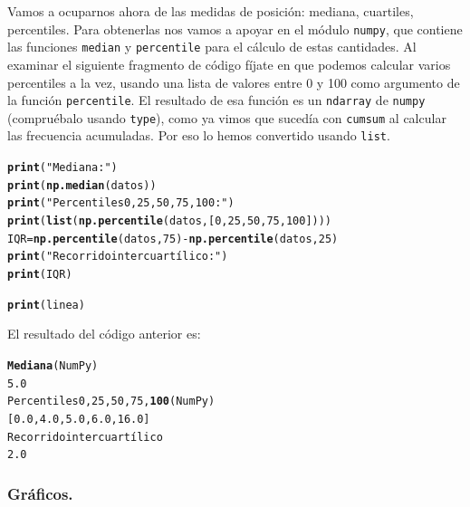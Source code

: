 \documentclass[10pt,a4paper]{article}\usepackage[]{graphicx}\usepackage[]{color}
\makeatletter
\newcommand{\hlstr}[1]{\textcolor[rgb]{0.192,0.494,0.8}{#1}}%
\newcommand{\hlkwd}[1]{\textcolor[rgb]{0.737,0.353,0.396}{\textbf{#1}}}%
\newenvironment{kframe}{%
 \def\at@end@of@kframe{}%
 \ifinner\ifhmode%
  \def\at@end@of@kframe{\end{minipage}}%
  \begin{minipage}{\columnwidth}%
 \fi\fi%
 \def\FrameCommand##1{\hskip\@totalleftmargin \hskip-\fboxsep
 \colorbox{shadecolor}{##1}\hskip-\fboxsep
     \hskip-\linewidth \hskip-\@totalleftmargin \hskip\columnwidth}%
 \MakeFramed {\advance\hsize-\width
   \@totalleftmargin\z@ \linewidth\hsize
   \@setminipage}}%
 {\par\unskip\endMakeFramed%
 \at@end@of@kframe}
\newenvironment{knitrout}{}{} %
\newcounter {cont01}
\makeatother
\begin{document}
Vamos a ocuparnos ahora de las medidas de posición: mediana, cuartiles, percentiles. Para obtenerlas nos vamos a apoyar en el módulo {\tt numpy}, que contiene las funciones {\tt median} y {\tt percentile} para el cálculo de estas cantidades. Al examinar el siguiente fragmento de código fíjate en que podemos calcular varios percentiles a la vez, usando una lista de valores entre 0 y 100 como argumento de la función {\tt percentile}. El resultado de esa función es un {\tt ndarray} de {\tt numpy} (compruébalo usando {\tt type}), como ya vimos que sucedía con {\tt cumsum} al calcular las frecuencia acumuladas. Por eso lo hemos convertido usando {\tt list}.
\begin{knitrout}
\color{fgcolor}\begin{kframe}
\begin{alltt}
\hlkwd{print}(\hlstr{"Mediana:"})
\hlkwd{print}(\hlkwd{np.median}(datos))
\hlkwd{print}(\hlstr{"Percentiles 0, 25, 50, 75, 100:"})
\hlkwd{print}(\hlkwd{list}(\hlkwd{np.percentile}(datos, [0, 25, 50, 75, 100])))
IQR = \hlkwd{np.percentile}(datos, 75) - \hlkwd{np.percentile}(datos, 25)
\hlkwd{print}(\hlstr{"Recorrido intercuartílico:"})
\hlkwd{print}(IQR)

\hlkwd{print}(linea)
\end{alltt}
\end{kframe}
\end{knitrout}
El resultado del código anterior es:

\begin{knitrout}
\color{fgcolor}\begin{kframe}
\begin{alltt}
\hlkwd{Mediana} (NumPy)
5.0
Percentiles 0, 25, 50, 75, \hlkwd{100}  (NumPy)
[0.0, 4.0, 5.0, 6.0, 16.0]
Recorrido intercuartílico
2.0
\end{alltt}
\end{kframe}
\end{knitrout}

\subsubsection*{Gráficos.}
\label{tut02:subsubsec:graficos}
\end{document}
